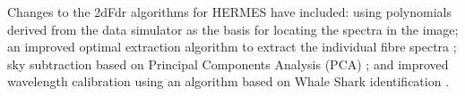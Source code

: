 \documentclass[11pt,twoside]{article}
\begin{document}
Changes to the 2dFdr algorithms for HERMES have included: using polynomials derived from the data simulator as the basis for locating the spectra in the image; an improved optimal extraction algorithm to extract the individual fibre spectra \citep{OptExt_2010}; sky subtraction based on Principal Components Analysis (PCA) \citep{PCA_2010}; and improved wavelength calibration using an algorithm based on Whale Shark identification \citep{Sharks_2005}.


\end{document}
